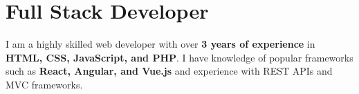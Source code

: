
\section{Full Stack Developer}
\small{
    I am a highly skilled web developer with over \textbf{3 years of experience} in \textbf{HTML, CSS, JavaScript, and PHP}. I have knowledge of popular frameworks such as \textbf{React, Angular, and Vue.js} and experience with REST APIs and MVC frameworks.
}